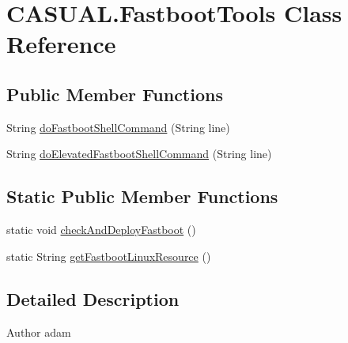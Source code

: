 \hypertarget{classCASUAL_1_1FastbootTools}{\section{C\-A\-S\-U\-A\-L.\-Fastboot\-Tools Class Reference}
\label{classCASUAL_1_1FastbootTools}
}
\subsection*{Public Member Functions}
\begin{DoxyCompactItemize}
\item 
String \hyperlink{classCASUAL_1_1FastbootTools_a987c870343c7a351e86be883e6b5ba65}{do\-Fastboot\-Shell\-Command} (String line)
\item 
String \hyperlink{classCASUAL_1_1FastbootTools_a2d7a1dc5dcdefce4b15844be2736dff5}{do\-Elevated\-Fastboot\-Shell\-Command} (String line)
\end{DoxyCompactItemize}
\subsection*{Static Public Member Functions}
\begin{DoxyCompactItemize}
\item 
static void \hyperlink{classCASUAL_1_1FastbootTools_a480cf5e63970928c8d7e2d881250c58c}{check\-And\-Deploy\-Fastboot} ()
\item 
static String \hyperlink{classCASUAL_1_1FastbootTools_a20125879a0b7d54b8f43c75fc74108ae}{get\-Fastboot\-Linux\-Resource} ()
\end{DoxyCompactItemize}


\subsection{Detailed Description}
\begin{DoxyAuthor}{Author}
adam 
\end{DoxyAuthor}


